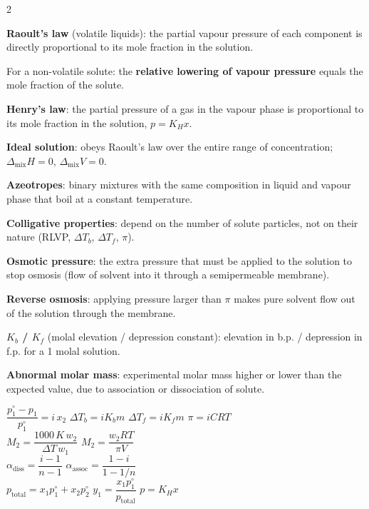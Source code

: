 \documentclass[10pt,a4paper]{extarticle}
\begin{document}
\begin{multicols}{2}
\begin{fl}
\item \textbf{Raoult's law} (volatile liquids): the partial vapour pressure of each component is directly proportional to its mole fraction in the solution.
\item For a non-volatile solute: the \textbf{relative lowering of vapour pressure} equals the mole fraction of the solute.
\item \textbf{Henry's law}: the partial pressure of a gas in the vapour phase is proportional to its mole fraction in the solution, $p=K_Hx$.
\item \textbf{Ideal solution}: obeys Raoult's law over the entire range of concentration; $\Delta_\text{mix}H=0$, $\Delta_\text{mix}V=0$.
\item \textbf{Azeotropes}: binary mixtures with the same composition in liquid and vapour phase that boil at a constant temperature.
\item \textbf{Colligative properties}: depend on the number of solute particles, not on their nature (RLVP, $\Delta T_b$, $\Delta T_f$, $\pi$).
\item \textbf{Osmotic pressure}: the extra pressure that must be applied to the solution to stop osmosis (flow of solvent into it through a semipermeable membrane).
\item \textbf{Reverse osmosis}: applying pressure larger than $\pi$ makes pure solvent flow out of the solution through the membrane.
\item \textbf{$K_b$ / $K_f$} (molal elevation / depression constant): elevation in b.p. / depression in f.p. for a 1 molal solution.
\item \textbf{Abnormal molar mass}: experimental molar mass higher or lower than the expected value, due to association or dissociation of solute.
\end{fl}

\begin{kbox}
$\dfrac{p_1^\circ-p_1}{p_1^\circ}=i\,x_2$ \quad $\Delta T_b=iK_bm$ \quad $\Delta T_f=iK_fm$ \quad $\pi=iCRT$\\[2pt]
$M_2=\dfrac{1000\,K\,w_2}{\Delta T\,w_1}$ \qquad $M_2=\dfrac{w_2RT}{\pi V}$\\[2pt]$\alpha_\text{diss}=\dfrac{i-1}{n-1}$ \qquad $\alpha_\text{assoc}=\dfrac{1-i}{1-1/n}$\\[2pt]
$p_\text{total}=x_1p_1^\circ+x_2p_2^\circ$ \quad $y_1=\dfrac{x_1p_1^\circ}{p_\text{total}}$ \quad $p=K_Hx$
\end{kbox}


\end{multicols}
\end{document}
